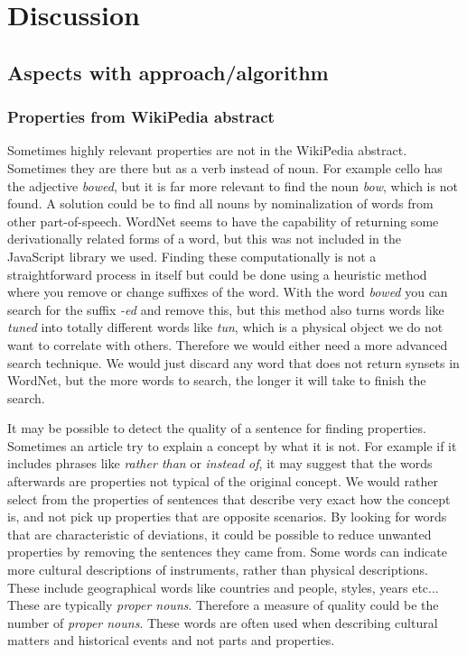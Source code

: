 
\chapter{Discussion} %

\label{Chapter8} %


\section{Aspects with approach/algorithm}

\subsection{Properties from WikiPedia abstract}
Sometimes highly relevant properties are not in the WikiPedia abstract. Sometimes they are there but as a verb instead of noun. For example cello has the adjective \emph{bowed}, but it is far more relevant to find the noun \emph{bow}, which is not found. A solution could be to find all nouns by nominalization of words from other part-of-speech. WordNet seems to have the capability of returning some derivationally related forms of a word, but this was not included in the JavaScript library we used. Finding these computationally is not a straightforward process in itself but could be done using a heuristic method where you remove or change suffixes of the word. With the word \emph{bowed} you can search for the suffix \emph{-ed} and remove this, but this method also turns words like \emph{tuned} into totally different words like \emph{tun}, which is a physical object we do not want to correlate with others. Therefore we would either need a more advanced search technique. We would just discard any word that does not return synsets in WordNet, but the more words to search, the longer it will take to finish the search.

It may be possible to detect the quality of a sentence for finding properties. Sometimes an article try to explain a concept by what it is not. For example if it includes phrases like \emph{rather than} or \emph{instead of}, it may suggest that the words afterwards are properties not typical of the original concept.
We would rather select from the properties of sentences that describe very exact how the concept is, and not pick up properties that are opposite scenarios. By looking for words that are characteristic of deviations, it could be possible to reduce unwanted properties by removing the sentences they came from.
Some words can indicate more cultural descriptions of instruments, rather than physical descriptions. These include geographical words like countries and people, styles, years etc... These are typically \emph{proper nouns}.
Therefore a measure of quality could be the number of \emph{proper nouns}. These words are often used when describing cultural matters and historical events and not parts and properties.


